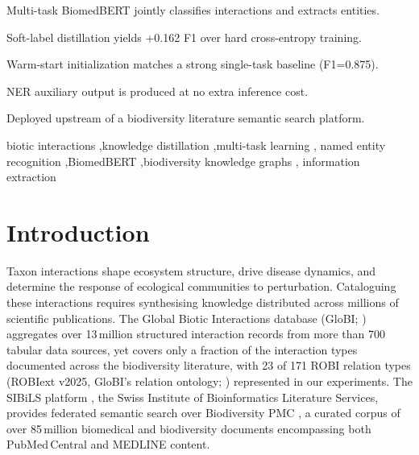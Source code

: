\documentclass[a4paper,fleqn]{cas-sc}
\begin{document}
\begin{highlights}
\item Multi-task BiomedBERT jointly classifies interactions and extracts entities.
\item Soft-label distillation yields +0.162 F1 over hard cross-entropy training.
\item Warm-start initialization matches a strong single-task baseline (F1=0.875).
\item NER auxiliary output is produced at no extra inference cost.
\item Deployed upstream of a biodiversity literature semantic search platform.
\end{highlights}

\begin{keywords}
biotic interactions \sep knowledge distillation \sep multi-task learning \sep
named entity recognition \sep BiomedBERT \sep biodiversity knowledge graphs \sep
information extraction
\end{keywords}

\maketitle

\section{Introduction}
\label{sec:intro}

Taxon interactions shape ecosystem structure, drive disease dynamics,
and determine the response of ecological communities to perturbation.
Cataloguing these interactions requires synthesising knowledge distributed
across millions of scientific publications.
The Global Biotic Interactions database (GloBI; \citep{poelen2014global})
aggregates over 13\,million structured interaction records from more than 700 tabular
data sources, yet covers only a fraction of the interaction types documented
across the biodiversity literature, with 23 of 171 ROBI relation types
(ROBIext v2025, GloBI's relation ontology; \citep{poelen2014global})
represented in our experiments.
The SIBiLS platform \citep{mottin2021sibils}, the Swiss Institute of
Bioinformatics Literature Services, provides federated semantic search over
Biodiversity PMC \citep{biodiversitypmc2024}, a curated corpus of over
85\,million biomedical and biodiversity documents encompassing both
PubMed\,Central and MEDLINE content.
\end{document}
